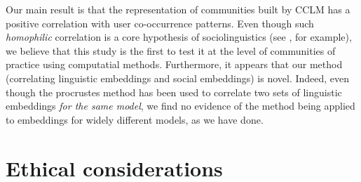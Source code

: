 \documentclass[11pt]{article}
\begin{document}


Our main result is that the representation of communities built by
CCLM has a positive correlation with user co-occurrence patterns.
Even though such \emph{homophilic} correlation is a core hypothesis of 
sociolinguistics (see \citet{Kovacs2020}, for example), 
we believe that this study is the first to test it at 
the level of communities of practice using computatial methods.
Furthermore, it appears that our method (correlating
linguistic embeddings and social embeddings) is novel. Indeed, even
though the procrustes method has been used to correlate two sets of
linguistic embeddings \emph{for the same model}, we find no evidence
of the method being applied to embeddings for widely different models,
as we have done.



\section{Ethical considerations}
\end{document}
